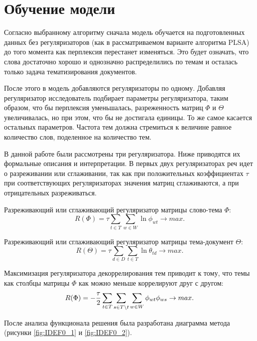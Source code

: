 %
\section{Обучение модели}

Согласно выбранному алгоритму сначала модель обучается на подготовленных данных без регуляризаторов (как в рассматриваемом варианте алгоритма PLSA) до того момента как перплексия перестанет изменяться. Это будет означать, что слова достаточно хорошо и однозначно распределились по темам и осталась только задача тематизирования документов.

После этого в модель добавляются регуляризаторы по одному. Добавляя регуляризатор исследователь подбирает параметры регуляризатора, таким образом, что бы перплексия уменьшалась, разреженность матриц $\Phi$ и $\Theta$ увеличивалась, но при этом, что бы не достигала единицы. То же самое касается остальных параметров. Частота тем должна стремиться к величине равное количество слов, поделенное на количество тем.

В данной работе были рассмотрены три регуляризатора. Ниже приводятся их формальные описания и интерпретации. В первых двух регуляризаторах реч идет о разреживании или сглаживании, так как при положительных коэффициентах $\tau$ при соответствующих регуляризаторах значения матриц сглаживаются, а при отрицательных разреживаться.

Разреживающий или сглаживающий регуляризатор матрицы слово-тема $\Phi$:
\begin{equation}
R(\Phi) = \tau \sum_{t \in T}{ \sum_{w \in W} \ln{ \phi_{wt} }} \rightarrow max.
\end{equation}

Разреживающий или сглаживающий регуляризатор матрицы тема-документ $\Theta$:
\begin{equation}
R(\Theta) = \tau \sum_{d \in D}{ \sum_{t \in T} \ln{ \theta_{td} }} \rightarrow max.
\end{equation}

Максимизация регуляризатора декоррелирования тем приводит к тому, что темы как столбцы матрицы $\Phi$ как можно меньше коррелируют друг с другом:
\begin{equation}
R(\Phi) = -{{\tau}\over{2}} \sum_{t \in T}{ 
    \sum_{s \in T \backslash t}{
        \sum_{w \in W}{
            \phi_{wt} \phi_{ws}
        }
    }
} \rightarrow max.
\end{equation}

После анализа функционала решения была разработана диаграмма метода (рисунки \ref{fig:IDEF0_1} и \ref{fig:IDEF0_2}).

